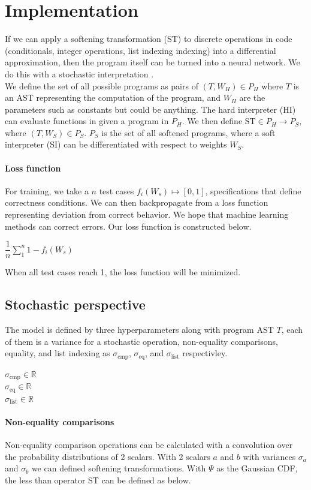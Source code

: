 \documentclass{article}
\begin{document}
\section*{Implementation}
If we can apply a softening transformation (ST) to discrete operations in code (conditionals, integer operations, list indexing indexing) into a differential approximation, then the program itself can be turned into a neural network. We do this with a stochastic interpretation \cite{blondel2024elementsdifferentiableprogramming}.\\
We define the set of all possible programs as pairs of $(T, W_H) \in P_H$ where $T$ is an AST representing the computation of the program, and $W_H$ are the parameters such as constants but could be anything. The hard interpreter (HI) can evaluate functions in given a program in $P_H$. We then define $\text{ST} \in P_H \longrightarrow P_S,$ where $(T, W_S) \in P_S$. $P_S$ is the set of all softened programs, where a soft interpreter (SI) can be differentiated with respect to weights $W_S$.\\
\paragraph{Loss function} For training, we take a $n$ test cases $f_i(W_s) \mapsto [0, 1]$,  specifications that define correctness conditions. We can then backpropagate from a loss function representing deviation from correct behavior. We hope that machine learning methods can correct errors. Our loss function is constructed below.
\begin{center}
  $\dfrac{1}{n} \sum_1^n 1 - f_i(W_s)$
\end{center}
When all test cases reach 1, the loss function will be minimized.
\subsection*{Stochastic perspective}
The model is defined by three hyperparameters along with program AST $T$, each of them is a variance for a stochastic operation, non-equality comparisons, equality, and list indexing as $\sigma_{\text{cmp}}$, $\sigma_{\text{eq}}$, and $\sigma_{\text{list}}$ respectivley.
\begin{center}
  $\sigma_{\text{cmp}} \in \mathbb{R}$\\
  $\sigma_{\text{eq}} \in \mathbb{R}$\\
  $\sigma_{\text{list}} \in \mathbb{R}$
\end{center}
\paragraph{Non-equality comparisons} Non-equality comparison operations can be calculated with a convolution over the probability distributions of 2 scalars. With 2 scalars $a$ and $b$ with variances $\sigma_a$ and $\sigma_b$ we can defined softening transformations. With $\Psi$ as the Gaussian CDF, the less than operator ST can be defined as below.
\end{document}
